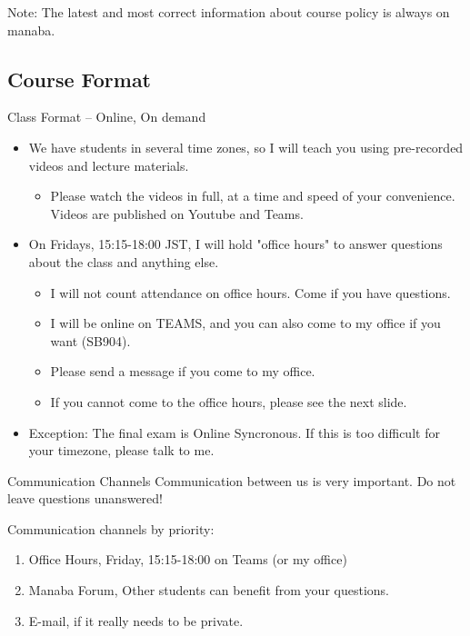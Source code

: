 \documentclass[aspectratio=169]{beamer}
\begin{document}
\begin{CJK}{UTF8}{ipxm}
\begin{frame}
  \alert{Note}: The latest and most correct information about course policy is always on manaba.
\end{frame}

\subsection{Course Format}
\begin{frame}{Class Format -- Online, On demand}
  \begin{itemize}
    \item We have students in several time zones, so I will teach you using pre-recorded videos and lecture materials.
    \begin{itemize}
      \item Please watch the videos in full, at a time and speed of your convenience. Videos are published on Youtube and Teams.
    \end{itemize}
    \item On Fridays, 15:15-18:00 JST, I will hold "office hours" to answer questions about the class and anything else.
    \begin{itemize}
      \item I will not count attendance on office hours. Come if you have questions.
      \item I will be online on TEAMS, and you can also come to my office if you want (SB904).
      \item Please send a message if you come to my office.
      \item If you cannot come to the office hours, please see the next slide.
    \end{itemize}
    \item \alert{Exception: The final exam is Online Syncronous. If this is too difficult for your timezone, please talk to me.}
  \end{itemize}

\end{frame}

\begin{frame}{Communication Channels}{}
  Communication between us is very important. Do not leave questions unanswered!\bigskip

  Communication channels by priority:
  \begin{enumerate}
    \item Office Hours, Friday, 15:15-18:00 on Teams (or my office)
    \item Manaba Forum, Other students can benefit from your questions.
    \item E-mail, if it really needs to be private.
  \end{enumerate}\bigskip


\end{frame}
\end{CJK}
\end{document}

